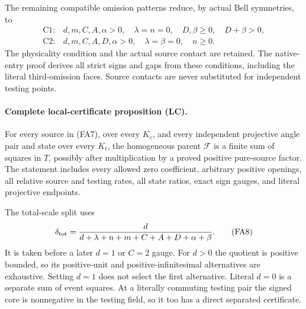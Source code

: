 The remaining compatible omission patterns reduce, by actual Bell
symmetries, to
\[
\begin{array}{ll}
\mathrm{C1}:&d,m,C,A,\alpha>0,\quad\lambda=n=0,\quad
             D,\beta\ge0,\quad D+\beta>0,\\
\mathrm{C2}:&d,m,C,A,D,\alpha>0,\quad\lambda=\beta=0,\quad n\ge0.
\end{array}                                                     \tag{FA7}
\]
The physicality condition and the actual source contact are retained.
The native-entry proof derives all strict signs and gaps from these
conditions, including the literal third-omission faces.  Source
contacts are never substituted for independent testing points.

\paragraph{Complete local-certificate proposition (LC).}
For every source in (FA7), over every $K_c$, and every independent
projective angle pair and state over every $K_t$, the homogeneous
parent $\mathcal F$ is a finite sum of squares in $T$, possibly after
multiplication by a proved positive pure-source factor.  The statement
includes every allowed zero coefficient, arbitrary positive openings,
all relative source and testing rates, all state ratios, exact sign
gauges, and literal projective endpoints.

The total-scale split uses
\[
 \delta_{\rm tot}=
 \frac{d}{d+\lambda+n+m+C+A+D+\alpha+\beta}.                    \tag{FA8}
\]
It is taken before a later $d=1$ or $C=2$ gauge.  For $d>0$ the
quotient is positive bounded, so its positive-unit and
positive-infinitesimal alternatives are exhaustive.  Setting $d=1$
does not select the first alternative.  Literal $d=0$ is a separate
sum of event squares.  At a literally commuting testing pair the
signed core is nonnegative in the testing field, so it too has a
direct separated certificate.

